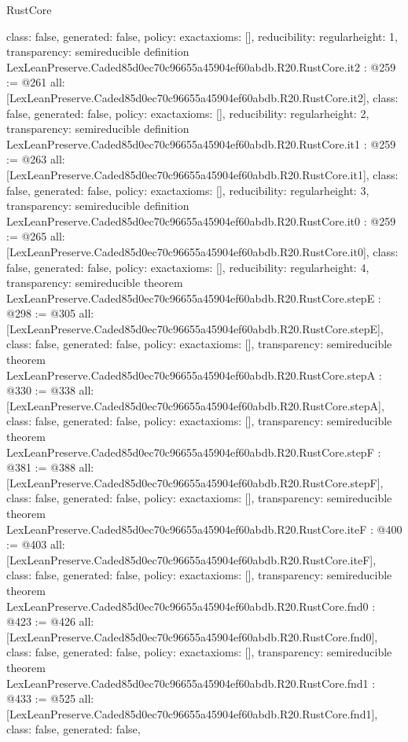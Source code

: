 \begin{lexlean}{RustCore}
\begin{coremodule}
{  class: false,
  generated: false,
  policy: exact{axioms: []},
  reducibility: regular{height: 1},
  transparency: semireducible
}
definition LexLeanPreserve.Caded85d0ec70c96655a45904ef60abdb.R20.RustCore.it2 : @259 := @261 {
  all: [LexLeanPreserve.Caded85d0ec70c96655a45904ef60abdb.R20.RustCore.it2],
  class: false,
  generated: false,
  policy: exact{axioms: []},
  reducibility: regular{height: 2},
  transparency: semireducible
}
definition LexLeanPreserve.Caded85d0ec70c96655a45904ef60abdb.R20.RustCore.it1 : @259 := @263 {
  all: [LexLeanPreserve.Caded85d0ec70c96655a45904ef60abdb.R20.RustCore.it1],
  class: false,
  generated: false,
  policy: exact{axioms: []},
  reducibility: regular{height: 3},
  transparency: semireducible
}
definition LexLeanPreserve.Caded85d0ec70c96655a45904ef60abdb.R20.RustCore.it0 : @259 := @265 {
  all: [LexLeanPreserve.Caded85d0ec70c96655a45904ef60abdb.R20.RustCore.it0],
  class: false,
  generated: false,
  policy: exact{axioms: []},
  reducibility: regular{height: 4},
  transparency: semireducible
}
theorem LexLeanPreserve.Caded85d0ec70c96655a45904ef60abdb.R20.RustCore.stepE : @298 := @305 {
  all: [LexLeanPreserve.Caded85d0ec70c96655a45904ef60abdb.R20.RustCore.stepE],
  class: false,
  generated: false,
  policy: exact{axioms: []},
  transparency: semireducible
}
theorem LexLeanPreserve.Caded85d0ec70c96655a45904ef60abdb.R20.RustCore.stepA : @330 := @338 {
  all: [LexLeanPreserve.Caded85d0ec70c96655a45904ef60abdb.R20.RustCore.stepA],
  class: false,
  generated: false,
  policy: exact{axioms: []},
  transparency: semireducible
}
theorem LexLeanPreserve.Caded85d0ec70c96655a45904ef60abdb.R20.RustCore.stepF : @381 := @388 {
  all: [LexLeanPreserve.Caded85d0ec70c96655a45904ef60abdb.R20.RustCore.stepF],
  class: false,
  generated: false,
  policy: exact{axioms: []},
  transparency: semireducible
}
theorem LexLeanPreserve.Caded85d0ec70c96655a45904ef60abdb.R20.RustCore.iteF : @400 := @403 {
  all: [LexLeanPreserve.Caded85d0ec70c96655a45904ef60abdb.R20.RustCore.iteF],
  class: false,
  generated: false,
  policy: exact{axioms: []},
  transparency: semireducible
}
theorem LexLeanPreserve.Caded85d0ec70c96655a45904ef60abdb.R20.RustCore.fnd0 : @423 := @426 {
  all: [LexLeanPreserve.Caded85d0ec70c96655a45904ef60abdb.R20.RustCore.fnd0],
  class: false,
  generated: false,
  policy: exact{axioms: []},
  transparency: semireducible
}
theorem LexLeanPreserve.Caded85d0ec70c96655a45904ef60abdb.R20.RustCore.fnd1 : @433 := @525 {
  all: [LexLeanPreserve.Caded85d0ec70c96655a45904ef60abdb.R20.RustCore.fnd1],
  class: false,
  generated: false,
}
\end{coremodule}
\end{lexlean}
